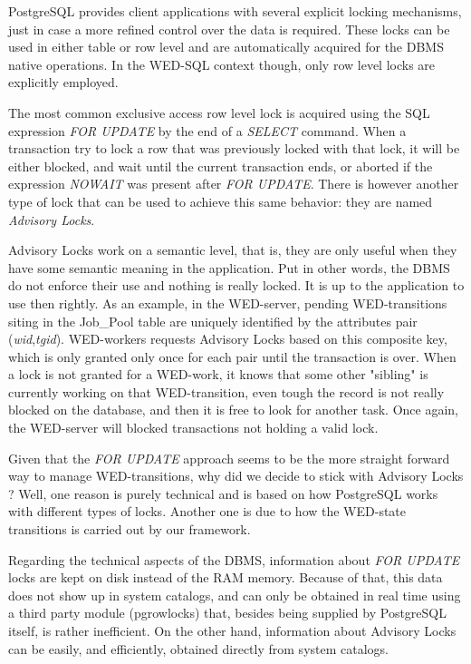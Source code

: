 \documentclass[12pt]{article}
\begin{document}
\par PostgreSQL provides client applications with several explicit locking mechanisms, just in case a more refined control
over the data is required. These locks can be used in either table or row level and are automatically acquired for the DBMS
native operations. In the WED-SQL context though, only row level locks are explicitly employed.  

\par The most common exclusive access row level lock is acquired using the SQL expression \emph{FOR UPDATE} by the end of
a \emph{SELECT} command. When a transaction try to lock a row that was previously locked with that lock, it will be either blocked,
and wait until the current transaction ends, or aborted if the expression \emph{NOWAIT} was present after \emph{FOR UPDATE}.
There is however another type of lock that can be used to achieve this same behavior: they are named \emph{Advisory Locks}.

\par Advisory Locks work on a semantic level, that is, they are only useful when they have some semantic meaning in the 
application. Put in other words, the DBMS do not enforce their use and nothing is really locked. It is up to the application
to use then rightly. As an example, in the WED-server, pending WED-transitions siting in the Job\_Pool table are uniquely
identified by the attributes pair (\emph{wid},\emph{tgid}). WED-workers requests Advisory Locks based on this composite key, 
which is only granted only once for each pair until the transaction is over. When a lock is not granted for a WED-work, it
knows that some other "sibling" is currently working on that WED-transition, even tough the record is not really blocked
on the database, and then it is free to look for another task. Once again, the WED-server will blocked transactions not
holding a valid lock. 
 
\par Given that the \emph{FOR UPDATE} approach seems to be the more straight forward way to manage WED-transitions, why
did we decide to stick with Advisory Locks ? Well, one reason is purely technical and is based on how PostgreSQL
works with different types of locks. Another one is due to how the WED-state transitions is carried out by our framework. 

\par Regarding the technical aspects of the DBMS, information about \emph{FOR UPDATE} locks are kept on disk instead of
the RAM memory. Because of that, this data does not show up in system catalogs, and can only be obtained in real time
using a third party module (pgrowlocks) that, besides being supplied by PostgreSQL itself, is rather inefficient. On the
other hand, information about Advisory Locks can be easily, and efficiently, obtained directly from system catalogs.  
\end{document}

